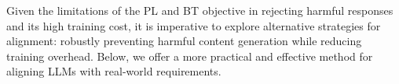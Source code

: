 
 
Given the limitations of the PL and BT objective in rejecting harmful responses and its high training cost, it is imperative to explore alternative strategies for alignment:  robustly preventing  harmful content generation while reducing training  overhead.  Below, we offer  a more practical and   effective  method for aligning LLMs with real-world requirements.  
  




%


